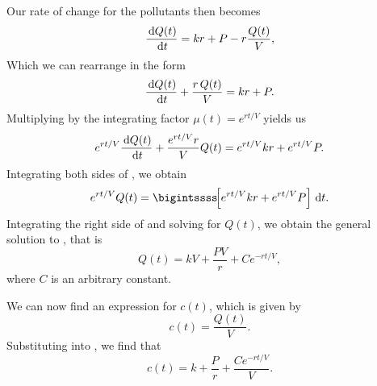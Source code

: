 \begin{ex}
\begin{enumerate}
\begin{sol}
          Our rate of change for the pollutants then becomes
          \begin{equation}
            \frac{\,\mathrm{d} Q(t)}{\,\mathrm{d} t} = kr+P-r\frac{Q(t)}{V},
            \label{dqdt}
          \end{equation}
          Which we can rearrange in the form
          \begin{equation}
            \frac{\,\mathrm{d} Q(t)}{\,\mathrm{d} t}+\frac{r\, Q(t)}{V} = kr+P.
            \label{dqdtr}
          \end{equation}
          Multiplying  by the integrating factor $\mu (t)=e^{rt/V}$ yields us
          \begin{equation}
            e^{rt/V}\frac{\,\mathrm{d} Q(t)}{\,\mathrm{d} t}+\frac{e^{rt/V}r}{V}Q(t) = e^{rt/V}kr+e^{rt/V}P.
            \label{dqif}
          \end{equation}
          Integrating both sides of , we obtain
          \begin{equation}
            e^{rt/V}Q(t) = \bigintssss \! \! \left[ e^{rt/V} kr + e^{rt/V}P\right] \ud t.
            \label{qint}
          \end{equation}
          Integrating the right side of  and solving for $Q(t)$, we obtain the general solution to , that is
          \begin{equation}
            Q(t) =  kV+\frac{PV}{r}+C e^{-rt/V},
            \label{qtsol}
          \end{equation}
          where $C$ is an arbitrary constant.

          We can now find an expression for $c(t)$, which is given by
          \begin{equation}
            c(t) =\frac{Q(t)}{V}.
            \label{ct}
          \end{equation}
          Substituting  into , we find that
          \begin{equation}
            c(t) = k + \frac{P}{r}+\frac{C e^{-rt/V}}{V}.
            \label{ct2}
          \end{equation}


\end{sol}
\end{enumerate}
\end{ex}
